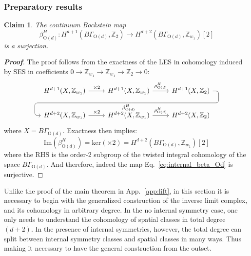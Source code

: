 \documentclass[aps,prx,reprint,superscriptaddress,twocolumn,amsmath,amssymb,amsfonts, nofootinbib]{revtex4-2}
\newcommand{\Z}{\mathbb{Z}}
\theoremstyle{apsstyle}
\newtheorem{claim}{Claim}
\begin{document}
\bigskip



\subsubsection{Preparatory results}
\label{app:prep_res_H}

\begin{claim}
The continuum Bockstein map
    \begin{equation}
    \label{eq:internal_beta_Od}
        \beta_{\mathrm{O}(d)}^{H}: H^{d+1}(B\Gamma_{\mathrm{O}(d)}, \mathbb{Z}_{2}) \to H^{d+2}(B\Gamma_{\mathrm{O}(d)}, \mathbb{Z}_{w_{1}})[2]
    \end{equation}
is a surjection.
\end{claim}
\begin{proof}[\textnormal{\textbf{Proof}}]
The proof follows from the exactness of the LES in cohomology induced by SES in coefficients $0\to \Z_{w_{1}}\to \Z_{w_{1}} \to \Z_{2}\to 0$:
\begin{equation*}
    \begin{tikzcd}
    H^{d+1}(X,\Z_{w_{1}}) \rar[]{\times 2} & H^{d+1}(X,\Z_{w_{1}}) \rar[]{\rho^{H}_{\mathrm{O}(d)}}
             \ar[draw=none]{d}[name=X, anchor=center]{}
    & H^{d+1}(X,\Z_{2}) \ar[rounded corners,
            to path={ -- ([xshift=2ex]\tikztostart.east)
                      |- (X.center) \tikztonodes
                      -| ([xshift=-2ex]\tikztotarget.west)
                      -- (\tikztotarget)}]{dll}[at end]{\beta_{\mathrm{O}(d)}^{H}} \\      
  H^{d+2}(X,\Z_{w_{1}}) \rar[]{\times 2} & H^{d+2}(X,\Z_{w_{1}}) \rar[]{\rho^{H}_{\mathrm{O}(d)}} & H^{d+2}(X,\Z_{2})
\end{tikzcd}
\end{equation*}
where $X=B\Gamma_{\mathrm{O}(d)}$. Exactness then implies:
\begin{equation*}
    \mathrm{Im}\left(\beta^{H}_{\mathrm{O}(d)}\right) = \mathrm{ker}\left(\times 2\right) = H^{d+2}(B\Gamma_{\mathrm{O}(d)},\Z_{w_{1}})[2]
\end{equation*}
where the RHS is the order-2 subgroup of the twisted integral cohomology of the space $B\Gamma_{\mathrm{O}(d)}$. And therefore, indeed the map Eq.~\ref{eq:internal_beta_Od} is surjective. 
\end{proof}

\bigskip 

Unlike the proof of the main theorem in App.~\ref{app:lift}, in this section it is necessary to begin with the generalized construction of the inverse limit complex, and its cohomology in arbitrary degree. In the no internal symmetry case, one only needs to understand the cohomology of spatial classes in total degree $(d+2)$. In the presence of internal symmetries, however, the total degree can split between internal symmetry classes and spatial classes in many ways. Thus making it necessary to have the general construction from the outset.
\end{document}

